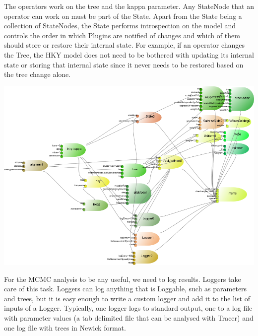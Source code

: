 \documentclass{article}
\begin{document}
The operators work on the tree and the kappa parameter. Any StateNode that an operator
can work on must be part of the State. Apart from the State being a collection of
StateNodes, the State performs introspection on the model and controls the order in
which Plugins are notified of changes and which of them should store or restore their
internal state. For example, if an operator changes the Tree, the HKY model does not
need to be bothered with updating its internal state or storing that internal state
since it never needs to be restored based on the tree change alone.

\includegraphics[width=\textwidth]{example5.png}
\rm\\\hskip10pt

For the MCMC analysis to be any useful, we need to log results. Loggers take care of
this task. Loggers can log anything that is Loggable, such as parameters and trees,
but it is easy enough to write a custom logger and add it to the list of inputs of
a Logger. Typically, one logger logs to standard output, one to a log file with
parameter values (a tab delimited file that can be analysed with Tracer) and one
log file with trees in Newick format.
\end{document}
